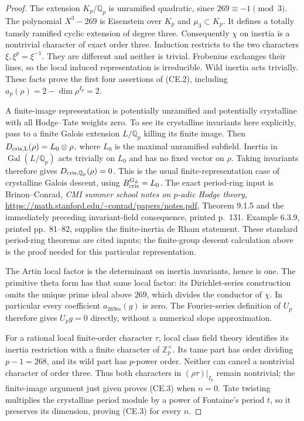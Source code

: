 \begin{proof}
The extension $K_p/\mathbb Q_p$ is unramified quadratic,
since $269\equiv-1\pmod3$.  The polynomial
$X^3-269$ is Eisenstein over $K_p$ and $\mu_3\subset K_p$.
It defines a totally tamely ramified cyclic extension of
degree three.  Consequently $\chi$ on inertia is a
nontrivial character of exact order three.  Induction
restricts to the two characters $\xi,\xi^p=\xi^{-1}$.
They are different and neither is trivial.  Frobenius
exchanges their lines, so the local induced representation
is irreducible.  Wild inertia acts trivially.  These facts
prove the first four assertions of (CE.2), including
$a_p(\rho)=2-\dim\rho^{I_p}=2$.

A finite-image representation is potentially unramified
and potentially crystalline with all Hodge--Tate weights
zero.  To see its crystalline invariants here explicitly,
pass to a finite Galois extension $L/\mathbb Q_p$ killing
its finite image.  Then
$D_{\rm cris,L}(\rho)=L_0\otimes\rho$, where $L_0$ is
the maximal unramified subfield.  Inertia in
$\operatorname{Gal}(L/\mathbb Q_p)$ acts trivially on
$L_0$ and has no fixed vector on $\rho$.  Taking invariants
therefore gives $D_{\rm cris,\mathbb Q_p}(\rho)=0$.
This is the usual finite-representation case of crystalline
Galois descent, using $B_{\rm cris}^{G_L}=L_0$.
The exact period-ring input is Brinon--Conrad,
\emph{CMI summer school notes on $p$-adic Hodge theory},
\url{https://math.stanford.edu/~conrad/papers/notes.pdf},
Theorem 9.1.5 and the immediately preceding invariant-field
consequence, printed p.~131.  Example 6.3.9, printed
pp.~81--82, supplies the finite-inertia de Rham statement.
These standard period-ring theorems are cited inputs;
the finite-group descent calculation above is the proof
needed for this particular representation.

The Artin local factor is the determinant on inertia
invariants, hence is one.  The primitive theta form has
that same local factor: its Dirichlet-series construction
omits the unique prime ideal above $269$, which divides
the conductor of $\chi$.  In particular every coefficient
$a_{269m}(g)$ is zero.  The Fourier-series definition of
$U_p$ therefore gives $U_pg=0$ directly, without a
numerical slope approximation.

For a rational local finite-order character $\tau$, local
class field theory identifies its inertia restriction with
a finite character of $\mathbb Z_p^\times$.  Its tame
part has order dividing $p-1=268$, and its wild part has
$p$-power order.  Neither can cancel a nontrivial character
of order three.  Thus both characters in
$(\rho\tau)|_{I_p}$ remain nontrivial; the finite-image
argument just given proves (CE.3) when $n=0$.
Tate twisting multiplies the crystalline period module by
a power of Fontaine's period $t$, so it preserves its
dimension, proving (CE.3) for every $n$.


\end{proof}

